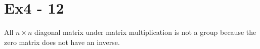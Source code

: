 \section*{Ex4 - 12}
All $ n \times n $ diagonal matrix under matrix multiplication is not a group because the zero matrix does not have an inverse.